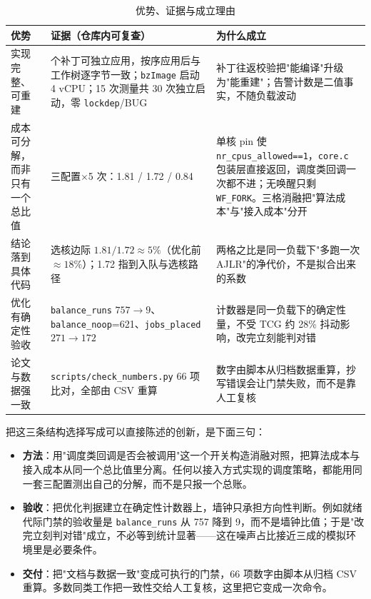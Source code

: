 \begin{table}[H]
\centering
\caption{优势、证据与成立理由}
\label{tab:advantages}
\small
\begin{tabular}{@{}>{\raggedright\arraybackslash}p{3.2cm}>{\raggedright\arraybackslash}p{5.0cm}>{\raggedright\arraybackslash}p{5.3cm}@{}}
\toprule
优势 & 证据（仓库内可复查） & 为什么成立 \\
\midrule
实现完整、可重建 & 6 个补丁可独立应用，按序应用后与工作树逐字节一致；\texttt{bzImage} 启动 4 vCPU；15 次测量共 30 次独立启动，零 \texttt{lockdep}/BUG & 补丁往返校验把"能编译"升级为"能重建"；告警计数是二值事实，不随负载波动 \\
成本可分解，而非只有一个总比值 & 三配置$\times$5 次：1.81 / 1.72 / 0.84 & 单核 pin 使 \texttt{nr\_cpus\_allowed==1}，\texttt{core.c} 包装层直接返回，调度类回调一次都不进；无唤醒只剩 \texttt{WF\_FORK}。三格消融把"算法成本"与"接入成本"分开 \\
结论落到具体代码 & 选核边际 $1.81/1.72\approx5\%$（优化前 $\approx18\%$）；1.72 指到入队与选核路径 & 两格之比是同一负载下"多跑一次 AJLR"的净代价，不是拟合出来的系数 \\
优化有确定性验收 & \texttt{balance\_runs} $757\to9$、\texttt{balance\_noop}=621、\texttt{jobs\_placed} $271\to172$ & 计数器是同一负载下的确定性量，不受 TCG 约 28\% 抖动影响，改完立刻能判对错 \\
论文与数据强一致 & \texttt{scripts/check\_numbers.py} 66 项比对，全部由 CSV 重算 & 数字由脚本从归档数据重算，抄写错误会让门禁失败，而不是靠人工复核 \\
\bottomrule
\end{tabular}
\end{table}

把这三条结构选择写成可以直接陈述的创新，是下面三句：

\begin{itemize}
  \item \textbf{方法}：用"调度类回调是否会被调用"这一个开关构造消融对照，把算法成本与接入成本从同一个总比值里分离。任何以接入方式实现的调度策略，都能用同一套三配置测出自己的分解，而不是只报一个总账。
  \item \textbf{验收}：把优化判据建立在确定性计数器上，墙钟只承担方向性判断。例如就绪代际门禁的验收量是 \texttt{balance\_runs} 从 757 降到 9，而不是墙钟比值；于是"改完立刻判对错"成立，不必等到统计显著——这在噪声占比接近三成的模拟环境里是必要条件。
  \item \textbf{交付}：把"文档与数据一致"变成可执行的门禁，66 项数字由脚本从归档 CSV 重算。多数同类工作把一致性交给人工复核，这里把它变成一次命令。
\end{itemize}

